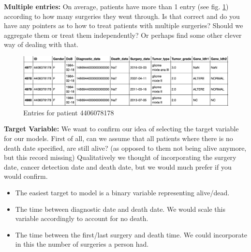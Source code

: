 \documentclass[a4paper]{article}
\begin{document}
%
\textbf{Multiple entries:} On average, patients have more than 1 entry (see fig. \ref{fig:m_entries}) according to how many surgeries they went through. Is that correct and do you have any pointers as to how to treat patients with multiple surgeries? Should we aggregate them or treat them independently? Or perhaps find some other clever way of dealing with that. 
\begin{figure}[H]
\centering
\includegraphics[width=1.0\linewidth]{images/multiple_entries.png}
\caption{Entries for patient 4406078178}
\label{fig:m_entries}
\end{figure}
% 
\textbf{Target Variable:}
We want to confirm our idea of selecting the target variable for our models. 
First of all, can we assume that all patients where there is no death date specified, are still alive? (as opposed to them not being alive anymore, but this record missing)
Qualitatively we thought of incorporating the surgery date, cancer detection date and death date, but we would much prefer if you would confirm. 
\begin{itemize}
\item The easiest target to model is a binary variable representing alive/dead.
\item The time between diagnostic date and death date. We would scale this variable accordingly to account for no death. 
\item The time between the first/last surgery and death time. We could incorporate in this the number of surgeries a person had. 
\end{itemize}
%
%
\end{document}
